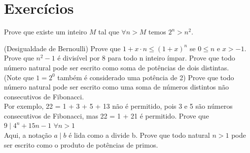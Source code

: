 \section{Exercícios}
\begin{questions}
\question Prove que existe um inteiro $M$ tal que $\forall n>M$ temos $2^n>n^2$.

 
 
\question (Desigualdade de Bernoulli) Prove que $1+x \cdot n \leq (1+x)^n$ se $0 \leq n$ e $x>-1$.
\question Prove que $n^2-1$ é divisível por 8 para todo n inteiro ímpar.
\question Prove que todo número natural pode ser escrito como soma de potências de dois distintas. \\ (Note que $1=2^0$ também é considerado uma potência de 2)
\question Prove que todo número natural pode ser escrito como uma soma de números distintos não consecutivos de Fibonacci. \\ Por exemplo, 22 = 1 + 3 + 5 + 13 não é permitido, pois 3 e 5 são números consecutivos de Fibonacci, mas 22 = 1 + 21 é permitido.
\question Prove que $9 \mid 4^n +15n-1 $ $\forall n>1$ \\ Aqui, a notação $a \mid b$ é lida como a divide b.
\question Prove que todo natural $n>1$ pode ser escrito como o produto de potências de primos.
\end{questions}

